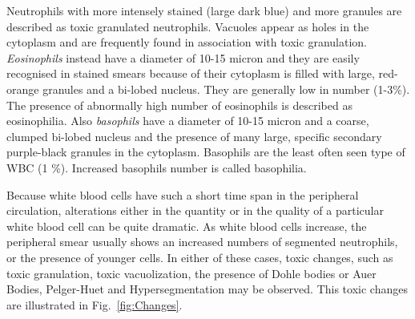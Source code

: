 \documentclass[final,a4paper,12pt,english]{UnicaPhdThesis3}
\begin{document}
Neutrophils with more intensely stained (large dark blue) and more granules are described as toxic granulated neutrophils. Vacuoles appear as holes in the cytoplasm and are frequently found in association with toxic granulation. \textit{Eosinophils} instead have a diameter of 10-15 micron and they are easily recognised in stained smears because of their cytoplasm is filled with large, red-orange granules and a bi-lobed nucleus. They are generally low in number (1-3\%). The presence of abnormally high number of eosinophils is described as eosinophilia. Also \textit{basophils} have a diameter of 10-15 micron and a coarse, clumped bi-lobed nucleus and the presence of many large, specific secondary purple-black granules in the cytoplasm. Basophils are the least often seen type of WBC (1	\%). Increased basophils number is called basophilia.

Because white blood cells have such a short time span in the peripheral circulation, alterations either in the quantity or in the quality of a particular white blood cell can be quite dramatic. As white blood cells increase, the peripheral smear usually shows an increased numbers of segmented neutrophils, or the presence of younger cells. In either of these cases, toxic changes, such as toxic granulation, toxic vacuolization, the presence of Dohle bodies or Auer Bodies, Pelger-Huet and Hypersegmentation may be observed. This toxic changes are illustrated in Fig.~\ref{fig:Changes}.
\end{document}
